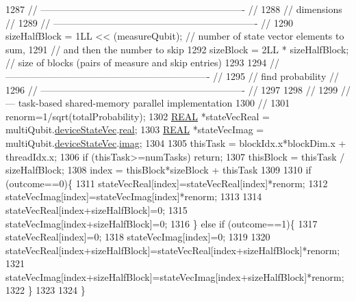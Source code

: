 \begin{DoxyCode}
1287     \textcolor{comment}{// ---------------------------------------------------------------- //}
1288     \textcolor{comment}{//            dimensions                                            //}
1289     \textcolor{comment}{// ---------------------------------------------------------------- //}
1290     sizeHalfBlock = 1LL << (measureQubit);                       \textcolor{comment}{// number of state vector elements to sum,}
1291     \textcolor{comment}{// and then the number to skip}
1292     sizeBlock     = 2LL * sizeHalfBlock;                           \textcolor{comment}{// size of blocks (pairs of measure and
       skip entries)}
1293 
1294     \textcolor{comment}{// ---------------------------------------------------------------- //}
1295     \textcolor{comment}{//            find probability                                      //}
1296     \textcolor{comment}{// ---------------------------------------------------------------- //}
1297 
1298     \textcolor{comment}{//}
1299     \textcolor{comment}{// --- task-based shared-memory parallel implementation}
1300     \textcolor{comment}{//}
1301     renorm=1/sqrt(totalProbability);
1302     \mbox{\hyperlink{QuEST__precision_8h_a4b654506f18b8bfd61ad2a29a7e38c25}{REAL}} *stateVecReal = multiQubit.\mbox{\hyperlink{structMultiQubit_a59ac613486a41b8c9a4b6e79cc8d2cc3}{deviceStateVec}}.\mbox{\hyperlink{structComplexArray_a4195cac6c784ea1b6271f1c7dba1548a}{real}};
1303     \mbox{\hyperlink{QuEST__precision_8h_a4b654506f18b8bfd61ad2a29a7e38c25}{REAL}} *stateVecImag = multiQubit.\mbox{\hyperlink{structMultiQubit_a59ac613486a41b8c9a4b6e79cc8d2cc3}{deviceStateVec}}.\mbox{\hyperlink{structComplexArray_a79dde47c7ae530c79cebfdf57b225968}{imag}};
1304 
1305     thisTask = blockIdx.x*blockDim.x + threadIdx.x;
1306     \textcolor{keywordflow}{if} (thisTask>=numTasks) \textcolor{keywordflow}{return};
1307     thisBlock = thisTask / sizeHalfBlock;
1308     index     = thisBlock*sizeBlock + thisTask%
1309 
1310     \textcolor{keywordflow}{if} (outcome==0)\{
1311         stateVecReal[index]=stateVecReal[index]*renorm;
1312         stateVecImag[index]=stateVecImag[index]*renorm;
1313 
1314         stateVecReal[index+sizeHalfBlock]=0;
1315         stateVecImag[index+sizeHalfBlock]=0;
1316     \} \textcolor{keywordflow}{else} \textcolor{keywordflow}{if} (outcome==1)\{
1317         stateVecReal[index]=0;
1318         stateVecImag[index]=0;
1319 
1320         stateVecReal[index+sizeHalfBlock]=stateVecReal[index+sizeHalfBlock]*renorm;
1321         stateVecImag[index+sizeHalfBlock]=stateVecImag[index+sizeHalfBlock]*renorm;
1322     \}
1323 
1324 \}
\end{DoxyCode}
\mbox{\label{QuEST__env__localGPU_8cu_a03b13dfcabd8c59b50dbdd3af44ba8b2}} 
